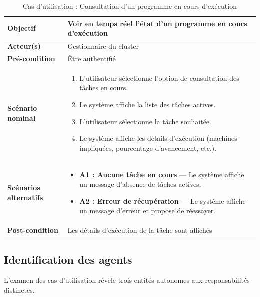 \documentclass[12pt,a4paper]{report}
\begin{document}
\begin{table}[H]
\centering
\renewcommand{\arraystretch}{1.3}
\begin{tabular}{|p{4cm}|p{11cm}|}
\hline
\textbf{Objectif} & Voir en temps réel l'état d'un programme en cours d'exécution \\
\hline
\textbf{Acteur(s)} & Gestionnaire du cluster \\
\hline
\textbf{Pré-condition} & Être authentifié \\
\hline
\textbf{Scénario nominal} &
\begin{enumerate}
    \item L'utilisateur sélectionne l'option de consultation des tâches en cours.
    \item Le système affiche la liste des tâches actives.
    \item L'utilisateur sélectionne la tâche souhaitée.
    \item Le système affiche les détails d'exécution (machines impliquées, pourcentage d'avancement, etc.).
\end{enumerate} \\
\hline
\textbf{Scénarios alternatifs} &
\begin{itemize}
    \item \textbf{A1 : Aucune tâche en cours} — Le système affiche un message d'absence de tâches actives.
    \item \textbf{A2 : Erreur de récupération} — Le système affiche un message d'erreur et propose de réessayer.
\end{itemize} \\
\hline
\textbf{Post-condition} & Les détails d'exécution de la tâche sont affichés \\
\hline
\end{tabular}
\caption{Cas d'utilisation : Consultation d'un programme en cours d'exécution}
\label{tab:view_program}
\end{table}

\subsection{Identification des agents}

L'examen des cas d'utilisation révèle trois entités autonomes aux responsabilités distinctes.
\end{document}
